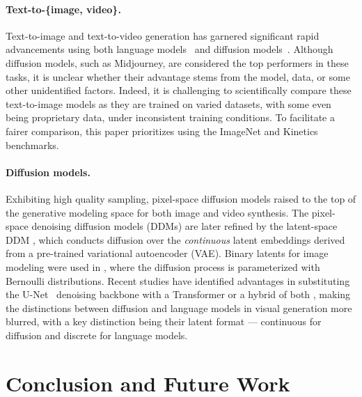 \vspace{-4mm}
\paragraph{Text-to-\{image, video\}.}
Text-to-image and text-to-video generation has garnered significant rapid advancements using both language models~\citep{yu2023scaling,chang2023muse} and diffusion models~\citep{ho2022imagen,blattmann2023align,singer2022make,ge2023preserve,ramesh2022hierarchical}. Although diffusion models, such as Midjourney, are considered the top performers in these tasks, it is unclear whether their advantage stems from the model, data, or some other unidentified factors. Indeed, it is challenging to scientifically compare these text-to-image models as they are trained on varied datasets, with some even being proprietary data, under inconsistent training conditions. To facilitate a fairer comparison, this paper prioritizes using the ImageNet and Kinetics benchmarks.

\vspace{-4mm}
\paragraph{Diffusion models.}
Exhibiting high quality sampling, pixel-space diffusion models \citep{sohl2015deep,song2019generative,ho2020denoising} raised to the top of the generative modeling space for both image \citep{ho2020denoising,dhariwal2021diffusion,saharia2022photorealistic} and video \citep{ho2022video,ho2022imagen,singer2022make} synthesis. The pixel-space denoising diffusion models (DDMs) are later refined by the latent-space DDM \citep{rombach2022high}, which conducts diffusion over the \emph{continuous} latent embeddings derived from a pre-trained variational autoencoder (VAE).
Binary latents for image modeling were used in \cite{wang2023binary}, where the diffusion process is parameterized with Bernoulli distributions.
Recent studies have identified advantages in substituting the U-Net~\citep{ronneberger2015u} denoising backbone with a Transformer \citep{peebles2022scalable,jabri2023scalable} or a hybrid of both \citep{hoogeboom2023simple}, making the distinctions between diffusion and language models in visual generation more blurred, with a key distinction being their latent format — continuous for diffusion and discrete for language models.

\vspace{-4mm}
\section{Conclusion and Future Work}
\vspace{-3mm}

